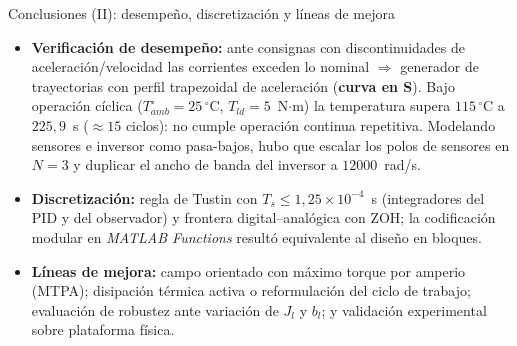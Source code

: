 \documentclass[aspectratio=169,t]{beamer}
\begin{document}
\begin{frame}{Conclusiones (II): desempeño, discretización y líneas de mejora}
\begin{itemize}\small
\item \textbf{Verificación de desempeño:} ante consignas con discontinuidades de aceleración/velocidad las corrientes exceden lo nominal $\Rightarrow$ generador de trayectorias con perfil trapezoidal de aceleración (\textbf{curva en S}). Bajo operación cíclica ($T_{amb}^\circ=25\,^\circ$C, $T_{ld}=5$~N$\cdot$m) la temperatura supera $115\,^\circ$C a $225{,}9$~s ($\approx 15$ ciclos): no cumple operación continua repetitiva. Modelando sensores e inversor como pasa-bajos, hubo que escalar los polos de sensores en $N=3$ y duplicar el ancho de banda del inversor a $12000$~rad/s.
\item \textbf{Discretización:} regla de Tustin con $T_s \leq 1{,}25\times 10^{-4}$~s (integradores del PID y del observador) y frontera digital–analógica con ZOH; la codificación modular en \textit{MATLAB Functions} resultó equivalente al diseño en bloques.
\item \textbf{Líneas de mejora:} campo orientado con máximo torque por amperio (MTPA); disipación térmica activa o reformulación del ciclo de trabajo; evaluación de robustez ante variación de $J_l$ y $b_l$; y validación experimental sobre plataforma física.
\end{itemize}
\end{frame}
\end{document}
